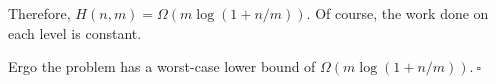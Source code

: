 \begin{enumerate}
\begin{solution}
Therefore, $H(n,m)=\Omega(m\log(1+n/m))$. Of course, the work done on each level is constant.

Ergo the problem has a worst-case lower bound of $\Omega(m\log(1+n/m)).~\square$
\end{solution}
\end{enumerate}